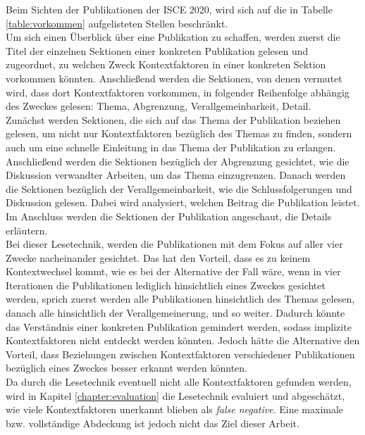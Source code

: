 Beim Sichten der Publikationen der ISCE 2020, wird sich auf die in Tabelle  \ref{table:vorkommen} aufgelisteten Stellen beschränkt. \\
Um sich einen Überblick über eine Publikation zu schaffen, werden zuerst die Titel der einzelnen Sektionen einer konkreten Publikation gelesen und zugeordnet, zu welchen Zweck Kontextfaktoren in einer konkreten Sektion vorkommen könnten. Anschließend werden die Sektionen, von denen vermutet wird, dass dort Kontextfaktoren vorkommen, in folgender Reihenfolge abhängig des Zweckes gelesen: Thema, Abgrenzung, Verallgemeinbarkeit, Detail. \\
Zunächst werden Sektionen, die sich auf das Thema der Publikation beziehen gelesen, um nicht nur Kontextfaktoren bezüglich des Themas zu finden, sondern auch um eine schnelle Einleitung in das Thema der Publikation zu erlangen. Anschließend werden die Sektionen bezüglich der Abgrenzung gesichtet, wie die Diskussion verwandter Arbeiten, um das Thema einzugrenzen. Danach werden die Sektionen bezüglich der Verallgemeinbarkeit, wie die Schlussfolgerungen und Diskussion gelesen. Dabei wird analysiert, welchen Beitrag die Publikation leistet. Im Anschluss werden die Sektionen der Publikation angeschaut, die Details erläutern.  \\

Bei dieser Lesetechnik, werden die Publikationen mit dem Fokus auf aller vier Zwecke nacheinander gesichtet. Das hat den Vorteil, dass es zu keinem Kontextwechsel kommt, wie es bei der Alternative der Fall wäre, wenn in vier Iterationen die Publikationen lediglich hinsichtlich eines Zweckes gesichtet werden, sprich zuerst werden alle Publikationen hinsichtlich des Themas gelesen, danach alle hinsichtlich der Verallgemeinerung, und so weiter. Dadurch könnte das Verständnis einer konkreten Publikation gemindert werden, sodass implizite Kontextfaktoren nicht entdeckt werden könnten. Jedoch hätte die Alternative den Vorteil, dass Beziehungen zwischen Kontextfaktoren verschiedener Publikationen bezüglich eines Zweckes besser erkannt werden könnten. \\

Da durch die Lesetechnik eventuell nicht alle Kontextfaktoren gefunden werden, wird in Kapitel \ref{chapter:evaluation} die Lesetechnik evaluiert und abgeschätzt, wie viele Kontextfaktoren unerkannt blieben als \textit{false negative}. Eine maximale bzw. vollständige Abdeckung ist jedoch nicht das Ziel dieser Arbeit. \\


